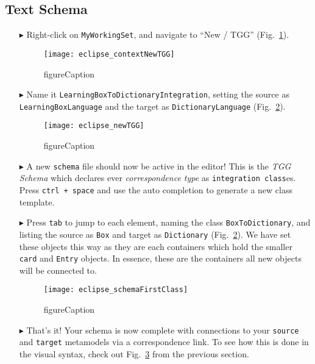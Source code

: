 \newpage
\hypertarget{schema tex}{}
\subsection{Text Schema}
\texHeader


\begin{itemize}

\item[$\blacktriangleright$] Right-click on \texttt{MyWorkingSet}, and navigate to ``New / TGG'' (Fig.~\ref{fig:contextTGG}).

\begin{figure}[htbp]
\begin{center}
  \texttt{[image: eclipse\_contextNewTGG]}
  \caption{figureCaption}
  \label{fig:contextTGG}
\end{center}
\end{figure}

\item[$\blacktriangleright$] Name it \texttt{LearningBoxToDictionaryIntegration}, setting the source as \texttt{LearningBoxLanguage} and the target as
\texttt{DictionaryLanguage} (Fig.~\ref{fig:newTGG}).

\begin{figure}[htbp]
\begin{center}
  \texttt{[image: eclipse\_newTGG]}
  \caption{figureCaption}
  \label{fig:newTGG}
\end{center}
\end{figure}

\item[$\blacktriangleright$] A new \texttt{schema} file should now be active in the editor! This is the \emph{TGG Schema} which declares ever
\emph{correspondence type} as \texttt{integration class}es. Press \texttt{ctrl + space} and use the auto completion to generate a new class template.

\item[$\blacktriangleright$] Press \texttt{tab} to jump to each element, naming the class \texttt{BoxToDictionary}, and listing the source as \texttt{Box}
and target as \texttt{Dictionary} (Fig.~\ref{fig:newTGG}). We have set these objects this way as they are each containers which hold the smaller \texttt{card}
and \texttt{Entry} objects. In essence, these are the containers all new objects will be connected to.

\begin{figure}[htbp]
\begin{center}
  \texttt{[image: eclipse\_schemaFirstClass]}
  \caption{figureCaption}
  \label{fig:firstCorrType}
\end{center}
\end{figure}

\item[$\blacktriangleright$] That's it! Your schema is now complete with connections to your \texttt{source} and \texttt{target} metamodels via a correspondence
link. To see how this is done in the visual syntax, check out Fig.~\ref{fig:firstCorrType} from the previous section.

\end{itemize}
